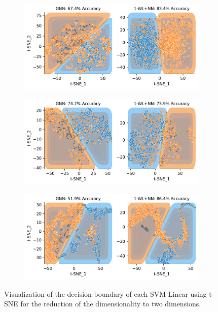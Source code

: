 \begin{figure}[!htb]
\begin{subfigure}[b]{0.49\textwidth}
		\vspace*{-4ex} 
		\caption{\mutag}
	\end{subfigure}
	\hfill
	\begin{subfigure}[b]{0.49\textwidth}
		\centering
		\includegraphics[width=\textwidth]{Figures/tsne_svm_lin_NCI1.pdf}
		\vspace*{-4ex} 
		\caption{\nci}
	\end{subfigure}
	\par\bigskip
	\begin{subfigure}[b]{0.49\textwidth}
		\centering
		\includegraphics[width=\textwidth]{Figures/tsne_svm_lin_PROTEINS.pdf}
		\vspace*{-4ex} 
		\caption{\proteins}
	\end{subfigure}
	\hfill
	\begin{subfigure}[b]{0.49\textwidth}
		\centering
		\includegraphics[width=\textwidth]{Figures/tsne_svm_lin_REDDIT.pdf}
		\vspace*{-4ex} 
		\caption{\reddit}
	\end{subfigure}
	\caption{Visualization of the decision boundary of each \textsf{SVM Linear} using \textsf{t-SNE} for the reduction of the dimensionality to two dimensions.}
	\label{fig:pool_svm_tsne}
\end{figure}

